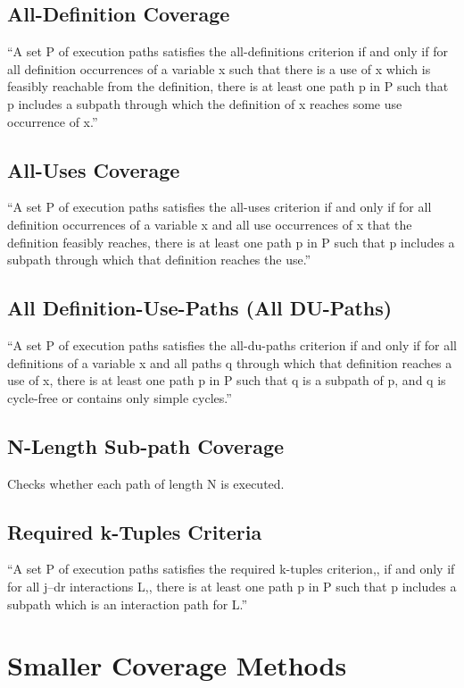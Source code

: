 \documentclass[12pt,a4paper]{report}
\begin{document}
\subsection{All-Definition Coverage}
“A set P of execution paths satisfies the all-definitions criterion if and only if for all definition occurrences of a variable x such that there is a use
 of x which is feasibly reachable from the definition, there is at least one path p in P such that p includes a subpath through which the definition of x
 reaches some use occurrence of x.”\cite{Zhu:1997:SUT:267580.267590}

\subsection{All-Uses Coverage}
“A set P of execution paths satisfies the all-uses criterion if and only if for all definition occurrences of a variable x and all use occurrences of x that
 the definition feasibly reaches, there is at least one path p in P such that p includes a subpath through which that definition reaches the use.”
\cite{Zhu:1997:SUT:267580.267590}

\subsection{All Definition-Use-Paths (All DU-Paths)}
“A set P of execution paths satisfies the all-du-paths criterion if and only if for all definitions of a variable x and all paths q through which that
 definition reaches a use of x, there is at least one path p in P such that q is a subpath of p, and q is cycle-free or contains only simple cycles.”
\cite{Zhu:1997:SUT:267580.267590}

\subsection{N-Length Sub-path Coverage}
Checks whether each path of length N is executed.

\subsection{Required k-Tuples Criteria}
“A set P of execution paths satisfies the required k-tuples criterion,, if and only if for all j–dr interactions L,, there is at least one path p in P such
 that p includes a subpath which is an interaction path for L.”\cite{Zhu:1997:SUT:267580.267590}

\section{Smaller Coverage Methods}
\end{document}
